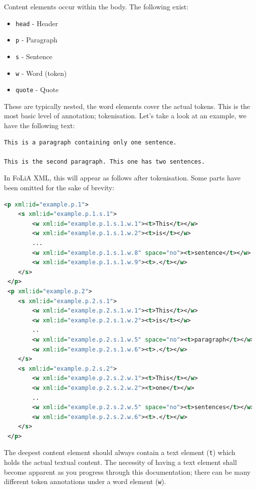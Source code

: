\documentclass[a4paper,12pt]{report}
\begin{document}
Content elements occur within the body. The following exist:

\begin{itemize}
\item \texttt{head} - Header
\item \texttt{p} - Paragraph
\item \texttt{s} - Sentence
\item \texttt{w} - Word (token)
\item \texttt{quote} - Quote
\end{itemize}

These are typically nested, the word elements cover the actual tokens. This is the most basic level of annotation; tokenisation. Let's take a look at an example, we have the following text:

\begin{verbatim}
This is a paragraph containing only one sentence.

This is the second paragraph. This one has two sentences.
\end{verbatim}

In FoLiA XML, this will appear as follows after tokenisation. Some parts have been omitted for the sake of brevity:


\begin{lstlisting}[language=xml]
 <p xml:id="example.p.1">
    <s xml:id="example.p.1.s.1">        
        <w xml:id="example.p.1.s.1.w.1"><t>This</t></w>
        <w xml:id="example.p.1.s.1.w.2"><t>is</t></w>
        ...
        <w xml:id="example.p.1.s.1.w.8" space="no"><t>sentence</t></w>
        <w xml:id="example.p.1.s.1.w.9"><t>.</t></w>
    </s>
 </p>
 <p xml:id="example.p.2">
    <s xml:id="example.p.2.s.1">
        <w xml:id="example.p.2.s.1.w.1"><t>This</t></w>
        <w xml:id="example.p.2.s.1.w.2"><t>is</t></w>    
        ..
        <w xml:id="example.p.2.s.1.w.5" space="no"><t>paragraph</t></w>    
        <w xml:id="example.p.2.s.1.w.6"><t>.</t></w>    
    </s>
    <s xml:id="example.p.2.s.2">
        <w xml:id="example.p.2.s.2.w.1"><t>This</t></w>
        <w xml:id="example.p.2.s.2.w.2"><t>one</t></w>    
        ..
        <w xml:id="example.p.2.s.2.w.5" space="no"><t>sentences</t></w>    
        <w xml:id="example.p.2.s.2.w.6"><t>.</t></w>    
    </s>
 </p>
\end{lstlisting}


The deepest content element should always contain a text element (\texttt{t}) which holds the actual textual content. The necessity of having a text element shall become apparent as you progress through this documentation; there can be many different token annotations under a word element (\texttt{w}).
\end{document}

